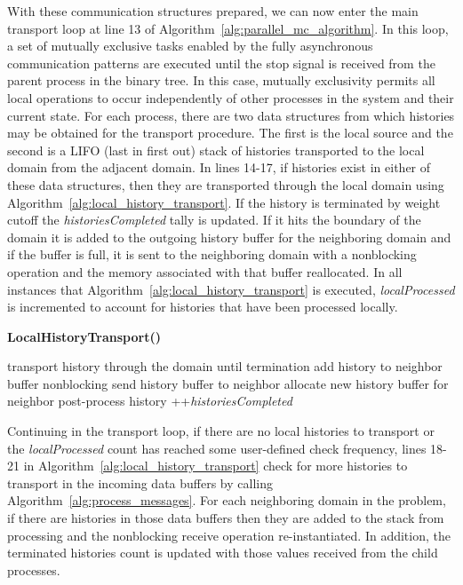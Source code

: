 With these communication structures prepared, we can now enter the
main transport loop at line 13 of
Algorithm~\ref{alg:parallel_mc_algorithm}. In this loop, a set of
mutually exclusive tasks enabled by the fully asynchronous
communication patterns are executed until the stop signal is received
from the parent process in the binary tree. In this case, mutually
exclusivity permits all local operations to occur independently of
other processes in the system and their current state. For each
process, there are two data structures from which histories may be
obtained for the transport procedure. The first is the local source
and the second is a LIFO (last in first out) stack of histories
transported to the local domain from the adjacent domain. In lines
14-17, if histories exist in either of these data structures, then
they are transported through the local domain using
Algorithm~\ref{alg:local_history_transport}. If the history is
terminated by weight cutoff the \textit{historiesCompleted} tally is
updated. If it hits the boundary of the domain it is added to the
outgoing history buffer for the neighboring domain and if the buffer
is full, it is sent to the neighboring domain with a nonblocking
operation and the memory associated with that buffer reallocated. In
all instances that Algorithm~\ref{alg:local_history_transport} is
executed, \textit{localProcessed} is incremented to account for
histories that have been processed locally.

\begin{algorithm}[h!]
  \caption{\textbf{LocalHistoryTransport()}}
  \label{alg:local_history_transport}
  \begin{algorithmic}[1]
    \State transport history through the domain until termination
    \State add history to neighbor buffer
    \State nonblocking send history buffer to neighbor
    \State allocate new history buffer for neighbor
    \EndIf
    \Else
    \State post-process history
    \State ++\textit{historiesCompleted}
    \EndIf
    \EndIf
  \end{algorithmic}
\end{algorithm}

Continuing in the transport loop, if there are no local histories to
transport or the \textit{localProcessed} count has reached some
user-defined check frequency, lines 18-21 in
Algorithm~\ref{alg:local_history_transport} check for more histories
to transport in the incoming data buffers by calling
Algorithm~\ref{alg:process_messages}. For each neighboring domain in
the problem, if there are histories in those data buffers then they
are added to the stack from processing and the nonblocking receive
operation re-instantiated. In addition, the terminated histories count
is updated with those values received from the child processes.

